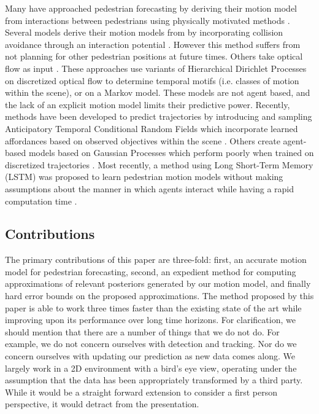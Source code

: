 \documentclass[letterpaper,10pt,conference]{ieeetran}
\begin{document}
Many have approached pedestrian forecasting by deriving their motion model from interactions between pedestrians using physically motivated methods \cite{Helbing1995,Xu2012}. 
	Several models derive their motion models from \cite{Helbing1995} by incorporating collision avoidance through an interaction potential \cite{Pellegrini2009,Yamaguchi2011,Yi2016}. 
	However this method suffers from not planning for other pedestrian positions at future times. 
	Others take optical flow as input \cite{Hospedales2009,Wang2009,Emonet2011}.
	These approaches use variants of Hierarchical Dirichlet Processes on discretized optical flow to determine temporal motifs (i.e. classes of motion within the scene), or on a Markov model. 
	 These models are not agent based, and the lack of an explicit motion model limits their predictive power. 
	 Recently, methods have been developed to predict trajectories by introducing and sampling Anticipatory Temporal Conditional Random Fields which incorporate learned affordances based on observed objectives within the scene \cite{Koppula2016}. 
	 Others create agent-based models based on Gaussian Processes which perform poorly when trained on discretized trajectories \cite{Tay2008,Wang2008,Trautman2015}. 
	Most recently, a method using Long Short-Term Memory (LSTM) was proposed to learn pedestrian motion models without making assumptions about the manner in which agents interact while having a rapid computation time \cite{Alahi2016}.

\subsection{Contributions}

The primary contributions of this paper are three-fold: first, an accurate motion model for pedestrian forecasting, second, an expedient method for computing approximations of relevant posteriors generated by our motion model, and finally hard error bounds on the proposed approximations.
The method proposed by this paper is able to work three times faster than the existing state of the art while improving upon its performance over long time horizons.
For clarification, we should mention that there are a number of things that we do not do.
For example, we do not concern ourselves with detection and tracking. 
Nor do we concern ourselves with updating our prediction as new data comes along.
We largely work in a 2D environment with a bird's eye view, operating under the assumption that the data has been appropriately transformed by a third party.
While it would be a straight forward extension to consider a first person perspective, it would detract from the presentation.
\end{document}
